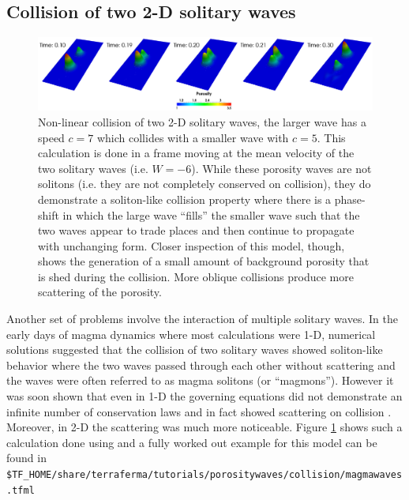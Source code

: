 \subsection{Collision of two 2-D solitary waves}
\label{sec:collision-two-2}

\begin{figure}[htbp!]
  \centering
  \includegraphics[width=\textwidth]{figures/collision.pdf}
  \caption{Non-linear collision of two 2-D solitary waves, the larger
    wave has a speed $c=7$ which collides with a smaller wave with
    $c=5$. This calculation is done in a frame moving at the mean
    velocity of the two solitary waves (i.e. $W=-6$).  While these
    porosity waves are not solitons (i.e. they are not completely
    conserved on collision), they do demonstrate a soliton-like
    collision property where there is a phase-shift in which  the large
    wave ``fills'' the smaller wave such that the two waves appear to
    trade places and then continue to propagate with unchanging form.
  Closer inspection of this model, though, shows the generation of a
  small amount of background porosity that is shed during the
  collision.  More oblique collisions produce more scattering of the
  porosity.  }
  \label{fig:collision}
\end{figure}

Another set of problems involve the interaction of multiple solitary
waves.  In the early days of magma dynamics where most calculations
were 1-D,  numerical solutions suggested that the collision of two
solitary waves showed soliton-like behavior where the two waves passed
through each other without scattering and the waves were often
referred to as magma solitons (or ``magmons'').  However it was soon
shown that even in 1-D the governing equations did not demonstrate an
infinite number of conservation laws and in fact showed scattering on
collision
\cite{barcilon_nonlinear-waves_1986,barcilon_solitary_1989}. Moreover,
in 2-D the scattering was much more noticeable. Figure
\ref{fig:collision} shows such a calculation done using \TF{} and a
fully worked out example for this model can be found in
\texttt{\$TF\_HOME/share/terraferma/tutorials/porositywaves/collision/magmawaves.tfml} 

